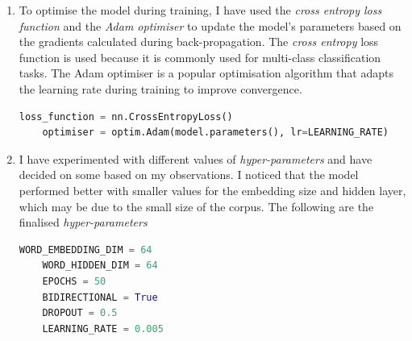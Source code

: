 \begin{enumerate}
\begin{lstlisting}[language=Python]
	\end{lstlisting}
	
	\item To optimise the model during training, I have used the \textit{cross entropy loss function} and the \textit{Adam optimiser} to update the model's parameters based on the gradients calculated during back-propagation. The \textit{cross entropy} loss function is used because it is commonly used for multi-class classification tasks. The Adam optimiser is a popular optimisation algorithm that adapts the learning rate during training to improve convergence.

	\begin{lstlisting}[language=Python]
	loss_function = nn.CrossEntropyLoss()
	optimiser = optim.Adam(model.parameters(), lr=LEARNING_RATE)
	\end{lstlisting}

	\item I have experimented with different values of \textit{hyper-parameters} and have decided on some based on my observations. I noticed that the model performed better with smaller values for the embedding size and hidden layer, which may be due to the small size of the corpus. The following are the finalised \textit{hyper-parameters}

	\begin{lstlisting}[language=Python]
	WORD_EMBEDDING_DIM = 64
	WORD_HIDDEN_DIM = 64
	EPOCHS = 50
	BIDIRECTIONAL = True
	DROPOUT = 0.5
	LEARNING_RATE = 0.005
	\end{lstlisting}
	
	
	
	
	
	
	
\end{enumerate}
